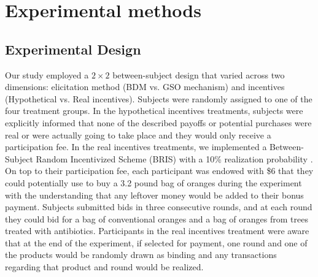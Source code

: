 \documentclass[12pt]{article}
\begin{document}


\section{Experimental methods}
\label{Experiment}

\subsection{Experimental Design}
Our study employed a $2\times2$ between-subject design that varied across two dimensions: elicitation method (BDM vs. GSO mechanism) and incentives (Hypothetical vs. Real incentives). Subjects were randomly assigned to one of the four treatment groups. In the hypothetical incentives treatments, subjects were explicitly informed that none of the described payoffs or potential purchases were real or were actually going to take place and they would only receive a participation fee. In the real incentives treatments, we implemented a Between-Subject Random Incentivized Scheme (BRIS) with a 10\% realization probability \citep{ahles_testing_2024}. On top to their participation fee, each participant was endowed with \$6 that they could potentially use to buy a 3.2 pound bag of oranges during the experiment with the understanding that any leftover money would be added to their bonus payment. Subjects submitted bids in three consecutive rounds, and at each round they could bid for a bag of conventional oranges and a bag of oranges from trees treated with antibiotics. Participants in the real incentives treatment were aware that at the end of the experiment, if selected for payment, one round and one of the products would be randomly drawn as binding and any transactions regarding that product and round would be realized.%
\end{document}
